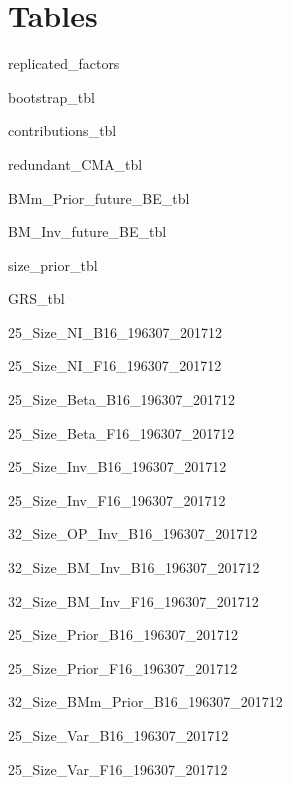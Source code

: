 
\section{Tables} \label{sec:tables}

{replicated_factors}

\begin{landscape}
{bootstrap_tbl}
\end{landscape}

{contributions_tbl}

{redundant_CMA_tbl}

{BMm_Prior_future_BE_tbl}

{BM_Inv_future_BE_tbl}

{size_prior_tbl}

{GRS_tbl}

{25_Size_NI_B16_196307_201712}

{25_Size_NI_F16_196307_201712}

{25_Size_Beta_B16_196307_201712}

{25_Size_Beta_F16_196307_201712}

{25_Size_Inv_B16_196307_201712}

{25_Size_Inv_F16_196307_201712}

\begin{landscape}
{32_Size_OP_Inv_B16_196307_201712}
\end{landscape}

\begin{landscape}
{32_Size_BM_Inv_B16_196307_201712}
\end{landscape}

\begin{landscape}
{32_Size_BM_Inv_F16_196307_201712}
\end{landscape}

{25_Size_Prior_B16_196307_201712}

{25_Size_Prior_F16_196307_201712}


\begin{landscape}
{32_Size_BMm_Prior_B16_196307_201712}
\end{landscape}

{25_Size_Var_B16_196307_201712}

{25_Size_Var_F16_196307_201712}

